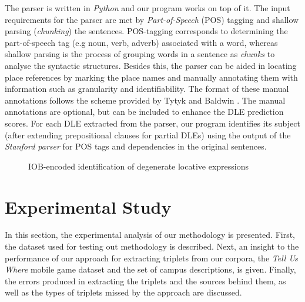 \documentclass{acm_proc_article-sp}
\begin{document}
The parser is written in \textit{Python} and our program works on top of it. The input requirements for the parser are met by \textit{Part-of-Speech} (POS) tagging and shallow parsing (\textit{chunking}) the sentences. POS-tagging corresponds to determining the part-of-speech tag (e.g noun, verb, adverb) associated with a word, whereas shallow parsing is the process of grouping words in a sentence as \textit{chunks} to analyse the syntactic structures. Besides this, the parser can be aided in locating place references by marking the place names and manually annotating them with information such as granularity and identifiability. The format of these manual annotations follows the scheme provided by Tytyk and Baldwin \cite{igor:annotations}. The manual annotations are optional, but can be included to enhance the DLE prediction scores. For each DLE extracted from the parser, our program identifies its subject (after extending prepositional clauses for partial DLEs) using the output of the \textit{Stanford parser} \cite{klein:accurate} for POS tags and dependencies in the original sentences. 
\begin{figure}
\centering
\caption{IOB-encoded identification of degenerate locative expressions}
\label{fig:IOB}
\end{figure}
\section{Experimental Study}
\label{sec:experimentalstudy}
In this section, the experimental analysis of our methodology is presented. First, the dataset used for testing out methodology is described. Next, an insight to the performance of our approach for extracting triplets from our corpora, the \textit{Tell Us Where} mobile game dataset and the set of campus descriptions, is given.  Finally, the errors produced in extracting the triplets and the sources behind them, as well as the types of triplets missed by the approach are discussed.  
\end{document}

